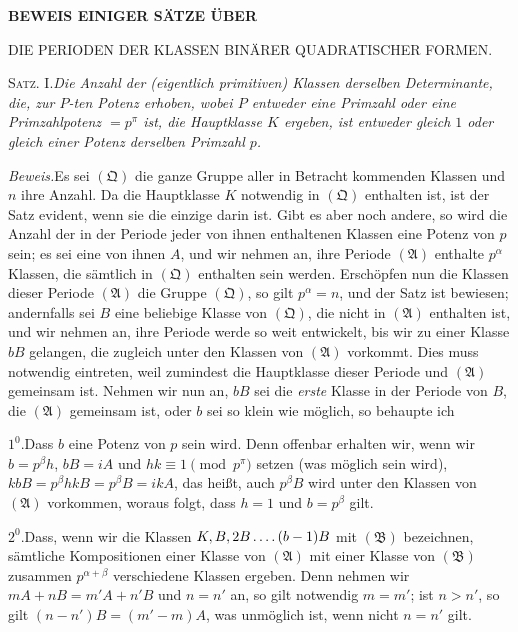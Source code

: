 \clearpage
{}
\renewcommand{\BookRunningTitle}{Die Perioden der Klassen}
\begin{center}
\Large\bfseries BEWEIS EINIGER SÄTZE ÜBER\par\medskip
\large DIE PERIODEN DER KLASSEN BINÄRER QUADRATISCHER FORMEN.
\end{center}

\textsc{Satz. I.}\quad\emph{Die Anzahl der (eigentlich primitiven) Klassen derselben Determinante, die, zur $P$-ten Potenz erhoben, wobei $P$ entweder eine Primzahl oder eine Primzahlpotenz $=p^\pi$ ist, die Hauptklasse $K$ ergeben, ist entweder gleich $1$ oder gleich einer Potenz derselben Primzahl $p$.}

\emph{Beweis.}\quad Es sei $(\mathfrak Q)$ die ganze Gruppe aller in Betracht kommenden Klassen und $n$ ihre Anzahl. Da die Hauptklasse $K$ notwendig in $(\mathfrak Q)$ enthalten ist, ist der Satz evident, wenn sie die einzige darin ist. Gibt es aber noch andere, so wird die Anzahl der in der Periode jeder von ihnen enthaltenen Klassen eine Potenz von $p$ sein; es sei eine von ihnen $A$, und wir nehmen an, ihre Periode $(\mathfrak A)$ enthalte $p^\alpha$ Klassen, die sämtlich in $(\mathfrak Q)$ enthalten sein werden. Erschöpfen nun die Klassen dieser Periode $(\mathfrak A)$ die Gruppe $(\mathfrak Q)$, so gilt $p^\alpha=n$, und der Satz ist bewiesen; andernfalls sei $B$ eine beliebige Klasse von $(\mathfrak Q)$, die nicht in $(\mathfrak A)$ enthalten ist, und wir nehmen an, ihre Periode werde so weit entwickelt, bis wir zu einer Klasse $bB$ gelangen, die zugleich unter den Klassen von $(\mathfrak A)$ vorkommt. Dies muss notwendig eintreten, weil zumindest die Hauptklasse dieser Periode und $(\mathfrak A)$ gemeinsam ist. Nehmen wir nun an, $bB$ sei die \emph{erste} Klasse in der Periode von $B$, die $(\mathfrak A)$ gemeinsam ist, oder $b$ sei so klein wie möglich, so behaupte ich

$1^0$.\quad Dass $b$ eine Potenz von $p$ sein wird. Denn offenbar erhalten wir, wenn wir $b=p^\beta h$, $bB=iA$ und $hk\equiv1\pmod{p^\pi}$ setzen (was möglich sein wird), $kbB=p^\beta hkB=p^\beta B=ikA$,
das heißt, auch $p^\beta B$ wird unter den Klassen von $(\mathfrak A)$ vorkommen, woraus folgt, dass $h=1$ und $b=p^\beta$ gilt.

$2^0$.\quad Dass, wenn wir die Klassen $K,B,2B\mathinner{.\,.\,.\,.}(b-1)B$ mit $(\mathfrak B)$ bezeichnen, sämtliche Kompositionen einer Klasse von $(\mathfrak A)$ mit einer Klasse von $(\mathfrak B)$ zusammen $p^{\alpha+\beta}$ verschiedene Klassen ergeben. Denn nehmen wir $mA+nB=m'A+n'B$ und $n=n'$ an, so gilt notwendig $m=m'$; ist $n>n'$, so gilt $(n-n')B=(m'-m)A$, was unmöglich ist, wenn nicht $n=n'$ gilt.

